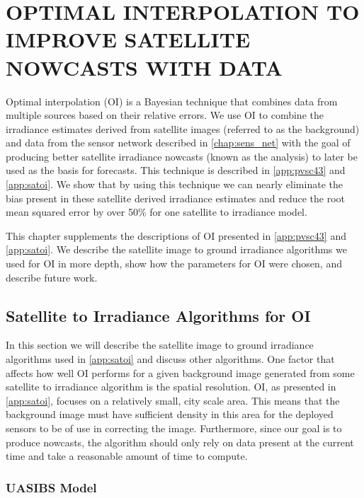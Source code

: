 \chapter{OPTIMAL INTERPOLATION TO IMPROVE SATELLITE NOWCASTS WITH DATA}
\label{chap:satoi}

Optimal interpolation (OI) is a Bayesian technique that combines data
from multiple sources based on their relative errors.
We use OI to combine the irradiance estimates derived from satellite
images (referred to as the background) and data from the sensor
network described in \cref{chap:sens_net} with the goal of producing
better satellite irradiance nowcasts (known as the analysis) to later
be used as the basis for forecasts.
This technique is described in \cref{app:pvsc43} and \cref{app:satoi}.
We show that by using this technique we can nearly eliminate the bias
present in these satellite derived irradiance estimates and reduce the
root mean squared error by over 50\% for one satellite to irradiance
model.

This chapter supplements the descriptions of OI presented in
\cref{app:pvsc43} and \cref{app:satoi}.
We describe the satellite image to ground irradiance algorithms we
used for OI in more depth, show how the parameters for OI were chosen,
and describe future work.

\section{Satellite to Irradiance Algorithms for OI}
In this section we will describe the satellite image to ground
irradiance algorithms used in \cref{app:satoi} and discuss other
algorithms.
One factor that affects how well OI performs for a given background
image generated from some satellite to irradiance algorithm is the
spatial resolution.
OI, as presented in \cref{app:satoi}, focuses on a relatively small,
city scale area.
This means that the background image must have sufficient density in
this area for the deployed sensors to be of use in correcting the
image.
Furthermore, since our goal is to produce nowcasts, the algorithm
should only rely on data present at the current time and take a
reasonable amount of time to compute.

\subsection{UASIBS Model}

